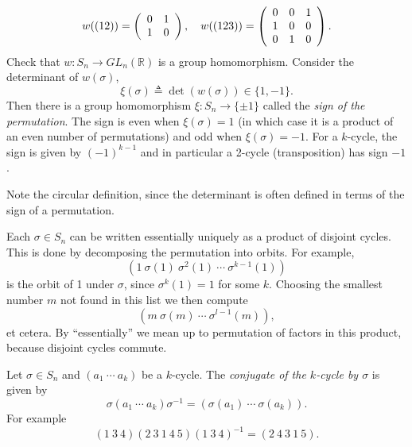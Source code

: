 \begin{xmpl}
$$
w((12)) = \left(\begin{array}{c c}
            0 & 1 \\ 1 & 0
          \end{array}\right), \quad
w((123)) = \left(\begin{array}{c c c}
             0 & 0 & 1 \\ 1 & 0 & 0 \\ 0 & 1 & 0
           \end{array}\right).
$$
Check that $w : S_n \to GL_n(\mathbb{R})$ is a group
homomorphism. Consider the determinant of $w(\sigma)$,
$$
\xi(\sigma) \triangleq \det(w(\sigma)) \in \{1, -1\}.
$$
Then there is a group homomorphism $\xi : S_n \to \{ \pm 1 \}$ called
the \emph{sign of the permutation}. The sign is even when $\xi(\sigma)
= 1$ (in which case it is a product of an even number of permutations)
and odd when $\xi(\sigma) = -1$. For a $k$-cycle, the sign is
given by $(-1)^{k-1}$ and in particular a 2-cycle (transposition) has
sign $-1$.

Note the circular definition, since the determinant is often defined
in terms of the sign of a permutation.
\end{xmpl}

\begin{remark}
Each $\sigma \in S_n$ can be written essentially uniquely as a product
of disjoint cycles. This is done by decomposing the permutation into
orbits. For example,
$$
(1 ~ \sigma(1) ~ \sigma^2(1) ~ \cdots ~ \sigma^{k-1}(1))
$$
is the orbit of 1 under $\sigma$, since $\sigma^k(1) = 1$ for some $k$.
Choosing the smallest number $m$ not found in this list we then compute
$$
(m ~ \sigma(m) ~ \cdots ~ \sigma^{l-1}(m)),
$$
et cetera. By ``essentially'' we mean up to permutation of factors in
this product, because disjoint cycles commute.
\end{remark}

\begin{theorem}
Let $\sigma \in S_n$ and $(a_1 ~ \cdots ~ a_k)$ be a $k$-cycle.
The \emph{conjugate of the $k$-cycle by $\sigma$} is given by
$$
\sigma(a_1 ~ \cdots ~ a_k)\sigma^{-1}
= (\sigma(a_1) ~ \cdots ~ \sigma(a_k)).
$$
For example
$$
(1 ~ 3 ~ 4) (2 ~ 3 ~ 1 ~ 4 ~ 5) (1 ~ 3 ~ 4)^{-1}
= (2 ~ 4 ~ 3 ~ 1 ~ 5).
$$
\end{theorem}

